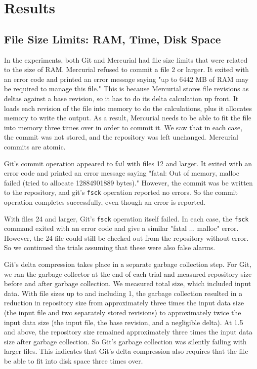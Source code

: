 \section{Results}

\subsection{File Size Limits: RAM, Time, Disk Space}

In the experiments, both Git and Mercurial had file size limits that were related to the size of RAM.
Mercurial refused to commit a file \SI{2}{\gib} or larger.
It exited with an error code and printed an error message saying "up to 6442 MB of RAM may be required to manage this file."
This is because Mercurial stores file revisions as deltas against a base revision, so it has to do its delta calculation up front.
It loads each revision of the file into memory to do the calculations, plus it allocates memory to write the output.
As a result, Mercurial needs to be able to fit the file into memory three times over in order to commit it.
We saw that in each case, the commit was not stored, and the repository was left unchanged.
Mercurial commits are atomic.

Git's commit operation appeared to fail with files \SI{12}{\gib} and larger.
It exited with an error code and printed an error message saying "fatal: Out of memory, malloc failed (tried to allocate \num{12884901889} bytes)."
However, the commit was be written to the repository, and git's \lstinline{fsck} operation reported no errors.
So the commit operation completes successfully, even though an error is reported.

With files \SI{24}{\gib} and larger, Git's \lstinline{fsck} operation itself failed.
In each case, the \lstinline{fsck} command exited with an error code and give a similar "fatal ... malloc" error.
However, the \SI{24}{\gib} file could still be checked out from the repository without error.
So we continued the trials assuming that these were also false alarms.

Git's delta compression takes place in a separate garbage collection step.
For Git, we ran the garbage collector at the end of each trial and measured repository size before and after garbage collection.
We measured total size, which included input data.
With file sizes up to and including \SI{1}{\gib}, the garbage collection resulted in a reduction in repository size from approximately three times the input data size (the input file and two separately stored revisions) to approximately twice the input data size (the input file, the base revision, and a negligible delta).
At \SI{1.5}{\gib} and above, the repository size remained approximately three times the input data size after garbage collection.
So Git's garbage collection was silently failing with larger files.
This indicates that Git's delta compression also requires that the file be able to fit into disk space three times over.

